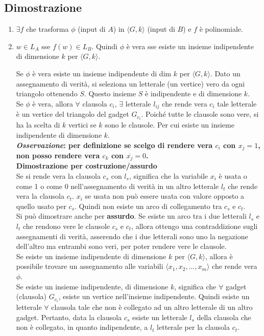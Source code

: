 \subsection{Dimostrazione}
\begin{enumerate}
    \item $\exists f$ che trasforma $\phi$ (input di $A$) in $\langle G,k \rangle$ (input di $B$) e $f$ è polinomiale.
    \item  $w \in L_A$ sse $f(w) \in L_B$. Quindi $\phi$ è vera sse esiste un insieme indipendente di dimensione $k$ per $\langle G,k \rangle$.
    
    Se $\phi$ è vera esiste un insieme indipendente di dim $k$ per $\langle G,k \rangle$. Dato un assegnamento di verità, si seleziona un letterale (un vertice) vero da ogni triangolo ottenendo $S$. Questo insieme $S$ è indipendente e di dimensione $k$. \\
    Se $\phi$ è vera, allora $\forall$ clausola $c_i$, $\exists$ letterale $l_{ij}$ che rende vera $c_i$ tale letterale è un vertice del triangolo del gadget $G_{c_{i}}$. Poiché tutte le clausole sono vere, si ha la scelta di $k$ vertici se $k$ sono le clausole. Per cui esiste un insieme indipendente di dimensione $k$.\\
        
    \textbf{\textit{Osservazione}: per definizione se scelgo di rendere vera $c_i$ con $x_j=1$, non posso rendere vera $c_k$ con $\overline{x_j} = 0$.} \\
    \textbf{Dimostrazione per costruzione/assurdo} \\
    
    Se si rende vera la clausola $c_s$ con $l_s$, significa che la variabile $x_i$ è usata o come 1 o come 0 nell’assegnamento di verità in un altro letterale $l_t$ che rende vera la clausola $c_t$. $x_i$ se usata non può essere usata con valore opposto a quello usato per $c_s$. Quindi non esiste un arco di collegamento tra $c_s$ e $c_t$. \\ 
    Si può dimostrare anche per \textbf{assurdo}. Se esiste un arco tra i due letterali $l_s$ e $l_t$ che rendono vere le clausole $c_s$ e $c_t$, allora ottengo una contraddizione sugli assegnamenti di verità, asserendo che i due letterali sono uno la negazione dell'altro ma entrambi sono veri, per poter rendere vere le clausole.\\
    
    Se esiste un insieme indipendente di dimensione $k$ per $\langle G,k \rangle$, allora è possibile trovare un assegnamento alle variabili $\langle x_1, x_2, \dots, x_m \rangle$ che rende vera $\phi$.\\
    Se esiste un insieme indipendente, di dimensione $k$, significa che $\forall$ gadget (clausola) $G_{c_i}$, esiste un vertice nell’insieme indipendente. Quindi esiste un letterale $\forall$ clausola tale che non è collegato ad un altro letterale di un altro gadget. Pertanto, data la clausola $c_s$ esiste un letterale $l_s$ della clausola che non è collegato, in quanto indipendente, a $l_t$ letterale per la clausola $c_t$. \\
        

\end{enumerate}
